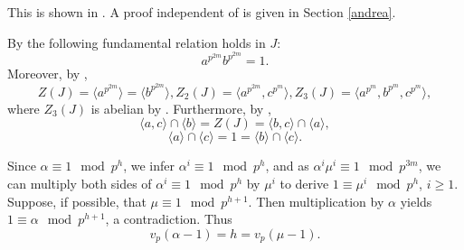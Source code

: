 \documentclass{amsart}
\theoremstyle{definition}
\theoremstyle{remark}
\begin{document}
This is shown in \cite[Theorem 8.1]{MS2}. A proof independent of \cite{MS2} is given in Section \ref{andrea}.


By \cite[Proposition 6.4]{MS} the following fundamental relation holds in $J$:
\begin{equation}
\label{funrel}
a^{p^{2m}}b^{p^{2m}}=1.
\end{equation}
Moreover, by \cite[Theorem 8.1]{MS}, 
\begin{equation}
\label{zj}
Z(J)=\langle a^{p^{2m}}\rangle=\langle b^{p^{2m}}\rangle, 
Z_2(J)=\langle a^{p^{2m}}, c^{p^m}\rangle, Z_3(J)=\langle a^{p^m}, b^{p^m}, c^{p^m}\rangle,
\end{equation}
where $Z_3(J)$ is abelian by \cite[Proposition 9.1]{MS}. Furthermore, by \cite[Proposition 7.2]{MS},
\begin{equation}
\label{inter1}
\langle a,c\rangle\cap \langle b\rangle=Z(J)=\langle b,c\rangle\cap \langle a\rangle,
\end{equation}
\begin{equation}
\label{inter2}
\langle a\rangle\cap \langle c\rangle=1=\langle b\rangle\cap \langle c\rangle.
\end{equation}


Since $\alpha\equiv 1\mod p^h$, we infer $\alpha^i\equiv 1\mod p^h$, and as $\alpha^i\mu^i\equiv 1\mod p^{3m}$,
we can multiply both sides of $\alpha^i\equiv 1\mod p^h$ by $\mu^i$ to derive $1\equiv \mu^i\mod p^h$, $i\geq 1$.
Suppose, if possible, that $\mu\equiv 1\mod p^{h+1}$. Then multiplication by $\alpha$
yields $1\equiv \alpha\mod p^{h+1}$, a contradiction. Thus
\begin{equation}
\label{vpm}
v_p(\alpha-1)=h=v_p(\mu-1).
\end{equation}
\end{document}
